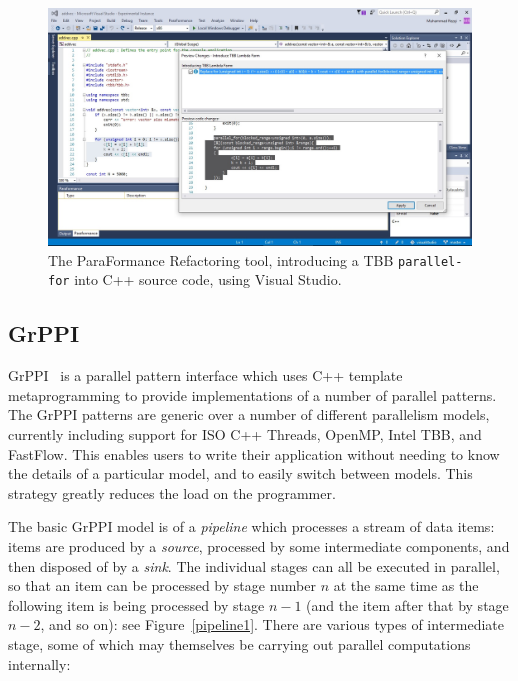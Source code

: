 \begin{figure}
    \centering
    \includegraphics[scale=0.3]{figures/TBBLambda.jpg}
    \caption{The ParaFormance Refactoring tool, introducing a TBB \texttt{parallel-for} into C++ source code, using Visual Studio.}
    \label{fig:paraformance1}
\end{figure}

\subsection{GrPPI}

GrPPI~\cite{D24,DBLP:journals/concurrency/AstorgaD0G17} is a parallel pattern interface
which uses C++ template metaprogramming to provide implementations of
a number of parallel patterns.  The GrPPI patterns are generic over a
number of different parallelism models, currently including support for ISO C++ Threads, OpenMP, Intel TBB, and FastFlow.  This enables users to write their application without
needing to know the details of a particular model, and to easily
switch between models.  This strategy greatly reduces the load on the programmer.



The basic GrPPI model is of a \textit{pipeline} which processes a
stream of data items: items are produced by a \textit{source},
processed by some intermediate components, and then disposed of by a
\textit{sink}. The individual stages can all be executed in parallel,
so that an item can be processed by stage number $n$ at the same time
as the following item is being processed by stage $n-1$ (and the item
after that by stage $n-2$, and so on): see Figure~\ref{pipeline1}.  
% 
There are various types of
intermediate stage, some of which may themselves be carrying out
parallel computations internally:  

